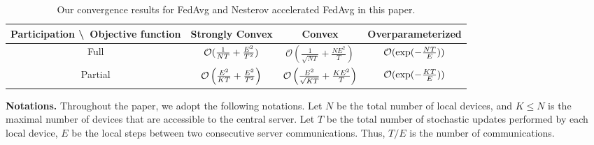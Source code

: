 \begin{table}[h!]
\centering
{\small
\begin{tabular}{|c|c|c|c|}\hline 
	Participation \textbackslash\ Objective function            & Strongly Convex        & Convex  & Overparameterized \\ \hline \hline
	Full                         & ${\mathcal{O}}(\frac{1}{NT}+\frac{E^{2}}{T^{2}})$    &  $\mathcal{O}\left(\frac{1}{\sqrt{NT}}+\frac{NE^{2}}{T}\right)$   & ${\mathcal{O}}(\exp(-\frac{NT}{E}))$    \\ \hline
	Partial                      &  ${\mathcal{O}}\left(\frac{E^{2}}{KT}+\frac{E^{2}}{T^{2}}\right)$   &  ${\mathcal{O}}\left(\frac{E^2}{\sqrt{KT}}+\frac{KE^2}{T} \right)$ & ${\mathcal{O}}(\exp(-\frac{KT}{E}))$     \\ \hline
\end{tabular}
}
\caption{Our convergence results for FedAvg and Nesterov accelerated FedAvg in this paper.}
\label{tb:convergencerateintro}
\end{table}



\textbf{Notations.}
Throughout the paper, we adopt the following notations. Let $N$ be the total
number of local devices, and $K \leq N$ is the maximal number of devices
that are accessible to the central server.  Let $T$ be the total number of stochastic updates performed by each local device, $E$ be the local steps between two consecutive server communications. Thus, $T/E$ is
the number of communications.






